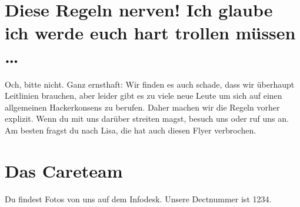 \documentclass[10pt,notumble]{leaflet}
\begin{document}
\section{Diese Regeln nerven! Ich glaube ich werde euch hart trollen müssen \ldots}
\label{sec-8}
Och, bitte nicht. Ganz ernsthaft: Wir finden es auch schade, dass wir
überhaupt Leitlinien brauchen, aber leider gibt es zu viele neue Leute
um sich auf einen allgemeinen Hackerkonsens zu berufen. Daher machen
wir die Regeln vorher explizit. Wenn du mit uns darüber streiten
magst, besuch uns oder ruf uns an. Am besten fragst du nach Lisa, die
hat auch diesen Flyer verbrochen.

\section{Das Careteam}
Du findest Fotos von uns auf dem Infodesk. Unsere Dectnummer ist 1234.
\end{document}
